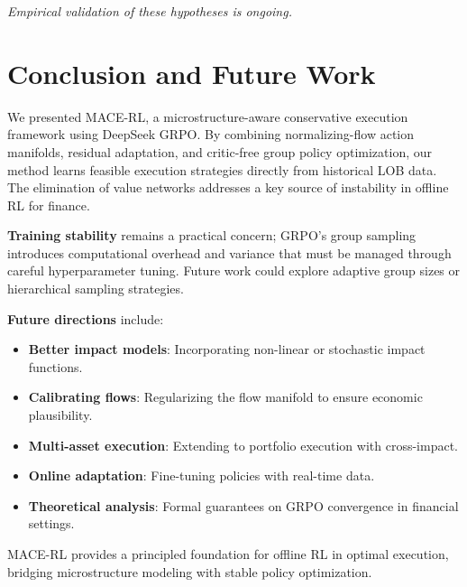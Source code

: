 \documentclass{article}
\begin{document}
\textit{Empirical validation of these hypotheses is ongoing.}

\section{Conclusion and Future Work}

We presented MACE-RL, a microstructure-aware conservative execution framework using DeepSeek GRPO. By combining normalizing-flow action manifolds, residual adaptation, and critic-free group policy optimization, our method learns feasible execution strategies directly from historical LOB data. The elimination of value networks addresses a key source of instability in offline RL for finance.

\textbf{Training stability} remains a practical concern; GRPO's group sampling introduces computational overhead and variance that must be managed through careful hyperparameter tuning. Future work could explore adaptive group sizes or hierarchical sampling strategies.

\textbf{Future directions} include:

\begin{itemize}
    \item \textbf{Better impact models}: Incorporating non-linear or stochastic impact functions.
    \item \textbf{Calibrating flows}: Regularizing the flow manifold to ensure economic plausibility.
    \item \textbf{Multi-asset execution}: Extending to portfolio execution with cross-impact.
    \item \textbf{Online adaptation}: Fine-tuning policies with real-time data.
    \item \textbf{Theoretical analysis}: Formal guarantees on GRPO convergence in financial settings.
\end{itemize}

MACE-RL provides a principled foundation for offline RL in optimal execution, bridging microstructure modeling with stable policy optimization.



\end{document}
